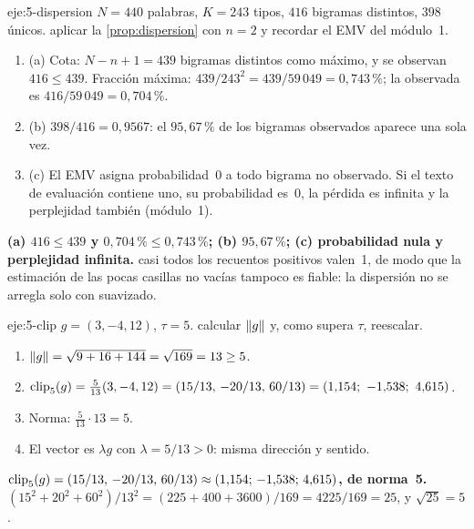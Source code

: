 \begin{solucion}{eje:5-dispersion}
\datos $N=440$ palabras, $K=243$ tipos, $416$ bigramas distintos, $398$ únicos.
\planteamiento aplicar la \cref{prop:dispersion} con $n=2$ y recordar el EMV del módulo~1.
\pasos
\begin{enumerate}[label=\arabic*.]
  \item (a) Cota: $N-n+1=439$ bigramas distintos como máximo, y se observan $416\le 439$. Fracción máxima: $439/243^{2}=439/59\,049=0{,}743\,\%$; la observada es $416/59\,049=0{,}704\,\%$.
  \item (b) $398/416=0{,}9567$: el $95{,}67\,\%$ de los bigramas observados aparece una sola vez.
  \item (c) El EMV asigna probabilidad~0 a todo bigrama no observado. Si el texto de evaluación contiene uno, su probabilidad es~0, la pérdida es infinita y la perplejidad también (módulo~1).
\end{enumerate}
\resultado \textbf{(a) $416\le 439$ y $0{,}704\,\%\le 0{,}743\,\%$; (b) $95{,}67\,\%$; (c) probabilidad nula y perplejidad infinita.}
\comprobacion casi todos los recuentos positivos valen~1, de modo que la estimación de las pocas casillas no vacías tampoco es fiable: la dispersión no se arregla solo con suavizado.
\end{solucion}

\begin{solucion}{eje:5-clip}
\datos $g=(3,-4,12)$, $\tau=5$.
\planteamiento calcular $\lVert g\rVert$ y, como supera $\tau$, reescalar.
\pasos
\begin{enumerate}[label=\arabic*.]
  \item $\lVert g\rVert=\sqrt{9+16+144}=\sqrt{169}=13\ge 5$.
  \item $\clip_5(g)=\frac{5}{13}(3,-4,12)=(15/13,\,-20/13,\,60/13)=(1{,}154;\ -1{,}538;\ 4{,}615)$.
  \item Norma: $\frac{5}{13}\cdot 13=5$.
  \item El vector es $\lambda g$ con $\lambda=5/13>0$: misma dirección y sentido.
\end{enumerate}
\resultado \textbf{$\operatorname{clip}_5(g)=(15/13,\,-20/13,\,60/13)\approx(1{,}154;\,-1{,}538;\,4{,}615)$, de norma~5.}
\comprobacion $(15^{2}+20^{2}+60^{2})/13^{2}=(225+400+3600)/169=4225/169=25$, y $\sqrt{25}=5$.
\end{solucion}

